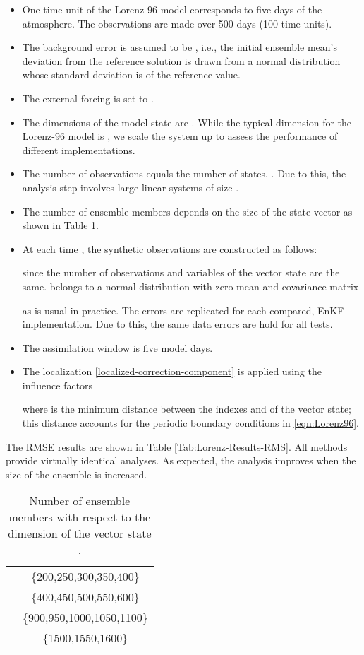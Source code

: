 \documentclass[12pt]{article}
\begin{document}
\begin{itemize}
\item One time unit of the Lorenz 96 model corresponds to five days of the atmosphere. The observations are made over 500 days (100 time units).
\item The background error is assumed to be , i.e., the initial ensemble mean's deviation from the reference solution is drawn from a normal distribution
whose standard deviation is  of the reference value.
\item The external forcing is set to . 
\item The dimensions of the model state  are . While the typical dimension for the Lorenz-96 model is ,
we scale the system up to assess the performance of different implementations.
\item The number of observations equals the number of states, . Due to this, the analysis step involves large linear systems of size . 
\item The number of ensemble members  depends on the size of the state vector as shown in Table  \ref{Tab:Experimental-Settings-Nens}.

\item At each time , the synthetic observations are constructed as follows:

since the number of observations and variables of the vector state are the same.  belongs to a normal distribution with zero mean and covariance matrix
 
as is usual in practice. The errors are replicated for each compared, EnKF implementation. Due to this, the same data errors are hold for all tests. 

\item The assimilation window is five model days.

\item The localization \eqref{localized-correction-component} is applied using the influence factors

where  is the minimum distance between the indexes  and  of the vector state; this distance accounts for the
periodic boundary conditions in \eqref{eqn:Lorenz96}.

\end{itemize}

The RMSE results are shown in Table  \ref{Tab:Lorenz-Results-RMS}.
All methods provide virtually identical analyses. As expected, the analysis improves when the size of the ensemble is increased. 

\begin{table}[H]
\centering
{
\begin{tabular}{|c|c|} \hline
 &   \\ \hline
 & \{200,250,300,350,400\} \\ \hline
 & \{400,450,500,550,600\} \\ \hline
 & \{900,950,1000,1050,1100\} \\ \hline
 & \{1500,1550,1600\} \\ \hline
\end{tabular}
}
\caption{Number of ensemble members  with respect to the dimension of the vector state .}
\label{Tab:Experimental-Settings-Nens}
\end{table}
\end{document}
